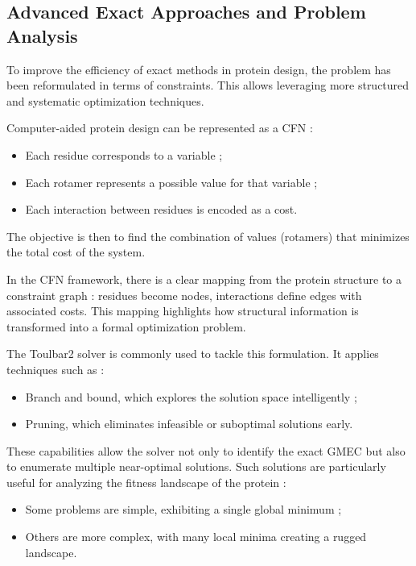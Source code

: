\documentclass[a4paper]{article}
\begin{document}
\subsection{Advanced Exact Approaches and Problem Analysis}%

To improve the efficiency of exact methods in protein design, the problem has been reformulated in terms of constraints. This allows leveraging more structured and systematic optimization techniques.

Computer-aided protein design can be represented as a \ac{CFN} :
\begin{itemize}
    \item Each residue corresponds to a variable ;
    \item Each rotamer represents a possible value for that variable ;
    \item Each interaction between residues is encoded as a cost.
\end{itemize}

The objective is then to find the combination of values (rotamers) that minimizes the total cost of the system.

In the \ac{CFN} framework, there is a clear mapping from the protein structure to a constraint graph : residues become nodes, interactions define edges with associated costs. This mapping highlights how structural information is transformed into a formal optimization problem.
\newline

The Toulbar2 solver is commonly used to tackle this formulation. It applies techniques such as :

\begin{itemize}
    \item Branch and bound, which explores the solution space intelligently ;
    \item Pruning, which eliminates infeasible or suboptimal solutions early.
\end{itemize}

These capabilities allow the solver not only to identify the exact \ac{GMEC} but also to enumerate multiple near-optimal solutions. Such solutions are particularly useful for analyzing the fitness landscape of the protein :

\begin{itemize}
    \item Some problems are simple, exhibiting a single global minimum ;
    \item Others are more complex, with many local minima creating a rugged landscape.
\end{itemize}
\end{document}
